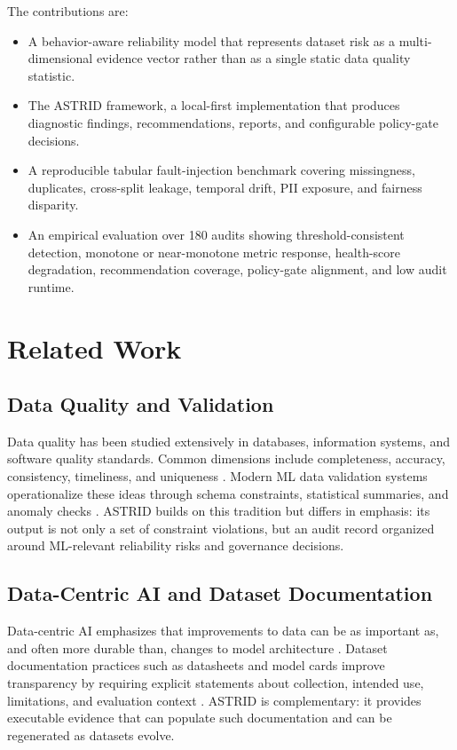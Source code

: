\documentclass[runningheads]{llncs}
\begin{document}
The contributions are:

\begin{itemize}
    \item A behavior-aware reliability model that represents dataset risk as a
    multi-dimensional evidence vector rather than as a single static data quality
    statistic.
    \item The ASTRID framework, a local-first implementation that produces
    diagnostic findings, recommendations, reports, and configurable policy-gate
    decisions.
    \item A reproducible tabular fault-injection benchmark covering missingness,
    duplicates, cross-split leakage, temporal drift, PII exposure, and fairness
    disparity.
    \item An empirical evaluation over 180 audits showing threshold-consistent
    detection, monotone or near-monotone metric response, health-score degradation,
    recommendation coverage, policy-gate alignment, and low audit runtime.
\end{itemize}

\section{Related Work}

\subsection{Data Quality and Validation}

Data quality has been studied extensively in databases, information systems, and
software quality standards. Common dimensions include completeness, accuracy,
consistency, timeliness, and uniqueness \cite{iso25012}. Modern ML data validation
systems operationalize these ideas through schema constraints, statistical
summaries, and anomaly checks \cite{breck2019,schelter2018}. ASTRID builds on this
tradition but differs in emphasis: its output is not only a set of constraint
violations, but an audit record organized around ML-relevant reliability risks
and governance decisions.

\subsection{Data-Centric AI and Dataset Documentation}

Data-centric AI emphasizes that improvements to data can be as important as, and
often more durable than, changes to model architecture \cite{sambasivan2021}.
Dataset documentation practices such as datasheets and model cards improve
transparency by requiring explicit statements about collection, intended use,
limitations, and evaluation context \cite{gebru2021,mitchell2019}. ASTRID is
complementary: it provides executable evidence that can populate such
documentation and can be regenerated as datasets evolve.
\end{document}
